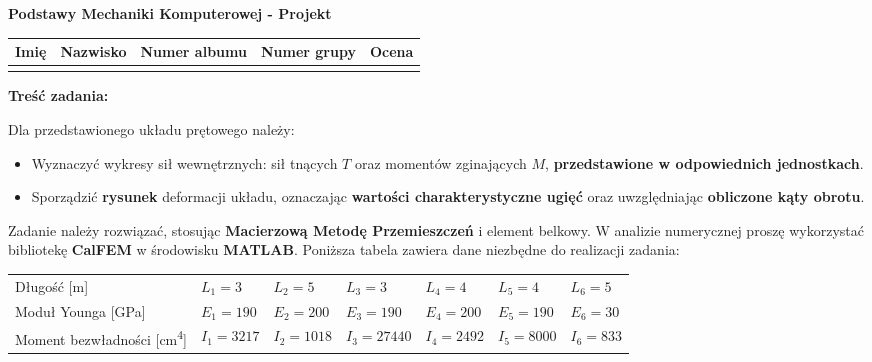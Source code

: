 \documentclass[a4paper,10pt]{article}
\begin{document}
    \begin{center}
    {\Large \textbf{Podstawy Mechaniki Komputerowej - Projekt}}
    \end{center}

    \begin{table}[ht]
        \centering
        \begin{tabular}{
            m{}m{}m{}m{}m{}}
        \toprule
        Imię & Nazwisko & Numer albumu & Numer grupy  & Ocena \\ \midrule
             &          &              &              &       \\ \bottomrule
        \end{tabular}
        \label{tab:dane_studenta}
    \end{table}

    \noindent\textbf{Treść zadania:} \vspace{1mm}

    Dla przedstawionego układu prętowego należy:

    \begin{itemize}
        \item Wyznaczyć wykresy sił wewnętrznych: sił tnących \(T\) oraz momentów zginających \(M\), \textbf{przedsta\-wione w odpowiednich jednostkach}.
        \item Sporządzić \textbf{rysunek} deformacji układu, oznaczając \textbf{wartości charakterystyczne ugięć} oraz uwzględniając \textbf{obliczone kąty obrotu}.
    \end{itemize}

    Zadanie należy rozwiązać, stosując \textbf{Macierzową Metodę Przemieszczeń} i element belkowy. W analizie numerycznej proszę wykorzystać bibliotekę \textbf{CalFEM} w środowisku \textbf{MATLAB}. Poniższa tabela zawiera dane niezbędne do realizacji zadania:

    \begin{table}[ht]
    \centering
    \renewcommand{\arraystretch}{1.25}
    \begin{tabular}{lllllll}
    \toprule
    Długość [\si{m}] &
                $L_{1} = 3$ &                $L_{2} = 5$ &                $L_{3} = 3$ &                $L_{4} = 4$ &                $L_{5} = 4$ &                $L_{6} = 5$             \\
    Moduł Younga [\si{GPa}] &
                $E_1 = 190$ &                $E_2 = 200$ &                $E_3 = 190$ &                $E_4 = 200$ &                $E_5 = 190$ &                $E_6 = 30$             \\
    Moment bezwładności [\si{\centi\meter^4}] &
                $I_1 = 3217$ &                $I_2 = 1018$ &                $I_3 = 27440$ &                $I_4 = 2492$ &                $I_5 = 8000$ &                $I_6 = 833$             \\
    \bottomrule
    \end{tabular}
    \label{tab:dane_zadania2}
    \end{table}
\end{document}
